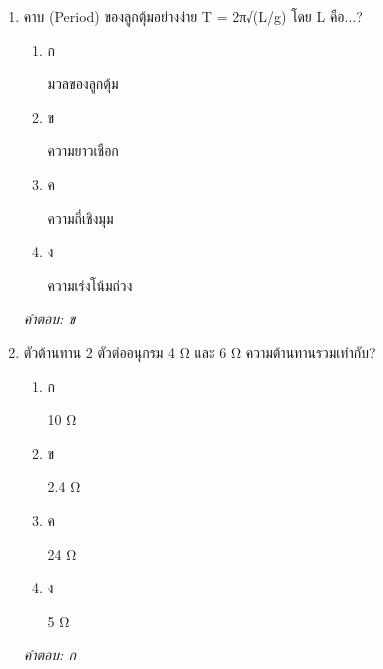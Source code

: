 \documentclass[12pt]{article}
\begin{document}
\begin{enumerate}[label=\arabic*., itemsep=0.5\baselineskip, topsep=0.5\baselineskip, leftmargin=*]
\item คาบ (Period) ของลูกตุ้มอย่างง่าย T = 2π√(L/g) โดย L คือ...?
\begin{enumerate}[label=\alph*)., itemsep=0.3\baselineskip, topsep=0.3\baselineskip]
\item ก\ 
\begin{minipage}[t]{0.9\linewidth}
\raggedright มวลของลูกตุ้ม
\end{minipage}
\item ข\ 
\begin{minipage}[t]{0.9\linewidth}
\raggedright ความยาวเชือก
\end{minipage}
\item ค\ 
\begin{minipage}[t]{0.9\linewidth}
\raggedright ความถี่เชิงมุม
\end{minipage}
\item ง\ 
\begin{minipage}[t]{0.9\linewidth}
\raggedright ความเร่งโน้มถ่วง
\end{minipage}
\end{enumerate}
\vspace{-0.3\baselineskip}
\begin{small}
\textit{คำตอบ: ข}
\end{small}

\item ตัวต้านทาน 2 ตัวต่ออนุกรม 4 Ω และ 6 Ω ความต้านทานรวมเท่ากับ?
\begin{enumerate}[label=\alph*)., itemsep=0.3\baselineskip, topsep=0.3\baselineskip]
\item ก\ 
\begin{minipage}[t]{0.9\linewidth}
\raggedright 10 Ω
\end{minipage}
\item ข\ 
\begin{minipage}[t]{0.9\linewidth}
\raggedright 2.4 Ω
\end{minipage}
\item ค\ 
\begin{minipage}[t]{0.9\linewidth}
\raggedright 24 Ω
\end{minipage}
\item ง\ 
\begin{minipage}[t]{0.9\linewidth}
\raggedright 5 Ω
\end{minipage}
\end{enumerate}
\vspace{-0.3\baselineskip}
\begin{small}
\textit{คำตอบ: ก}
\end{small}


\end{enumerate}
\end{document}
